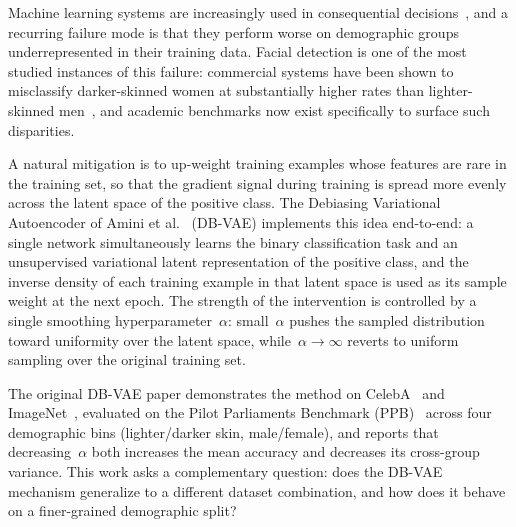 \documentclass[10pt,twocolumn]{article}
\begin{document}
Machine learning systems are increasingly used in consequential
decisions~\cite{klare2012face}, and a recurring failure mode is that they
perform worse on demographic groups underrepresented in their training
data. Facial detection is one of the most studied instances of this
failure: commercial systems have been shown to misclassify darker-skinned
women at substantially higher rates than lighter-skinned
men~\cite{buolamwini2018gendershades}, and academic benchmarks now exist
specifically to surface such disparities.

A natural mitigation is to up-weight training examples whose features are
rare in the training set, so that the gradient signal during training is
spread more evenly across the latent space of the positive class.
The Debiasing Variational Autoencoder of Amini et
al.~\cite{amini2019dbvae} (DB-VAE) implements this idea end-to-end: a
single network simultaneously learns the binary classification task and an
unsupervised variational latent representation of the positive class, and
the inverse density of each training example in that latent space is used
as its sample weight at the next epoch.
The strength of the intervention is
controlled by a single smoothing hyperparameter~$\alpha$: small~$\alpha$
pushes the sampled distribution toward uniformity over the latent space,
while~$\alpha \to \infty$ reverts to uniform sampling over the original
training set.

The original DB-VAE paper demonstrates the method on CelebA~\cite{liu2015celeba} and ImageNet~\cite{deng2009imagenet},
evaluated on the Pilot Parliaments Benchmark (PPB)~\cite{buolamwini2018gendershades}
across four demographic bins (lighter/darker skin, male/female), and
reports that decreasing~$\alpha$ both increases the mean accuracy and decreases
its cross-group variance. This work asks a complementary question: does the
DB-VAE mechanism generalize to a different dataset combination, and how
does it behave on a finer-grained demographic split?
\end{document}
